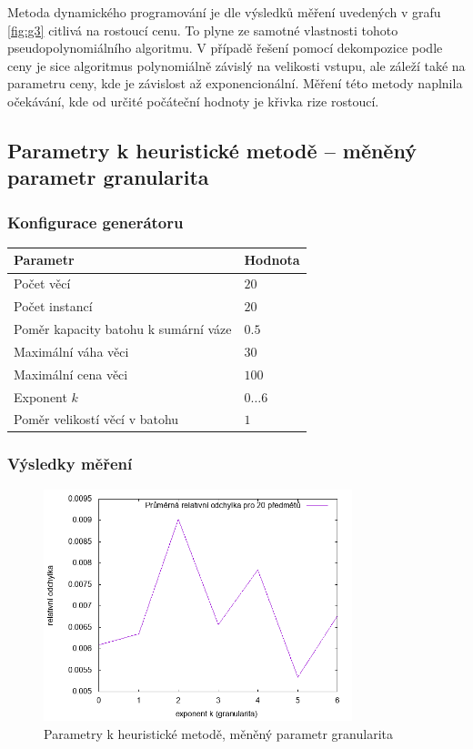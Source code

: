 \documentclass{article}
\begin{document}
Metoda dynamického programování je dle výsledků měření uvedených v grafu \ref{fig:g3} citlivá na rostoucí cenu.
To plyne ze samotné vlastnosti tohoto pseudopolynomiálního algoritmu.
V případě řešení pomocí dekompozice podle ceny je sice algoritmus polynomiálně závislý na velikosti vstupu, ale záleží také na parametru ceny, kde je závislost až exponencionální.
Měření této metody naplnila očekávání, kde od určité počáteční hodnoty je křivka rize rostoucí.

\subsection{Parametry k heuristické metodě -- měněný parametr granularita}

\subsubsection*{Konfigurace generátoru}

\begin{table}[H]
\centering
    \begin{tabular}{ |l|l| } 
        \hline
        Parametr & Hodnota \\
        \hline
        \hline
        Počet věcí & $20$ \\
        Počet instancí & $20$ \\
        Poměr kapacity batohu k sumární váze & $0.5$ \\
        Maximální váha věci & $30$ \\
        Maximální cena věci & $100$ \\
        Exponent $k$ & $0 \dots 6$ \\
        Poměr velikostí věcí v batohu & $1$ \\
        \hline
    \end{tabular}
\end{table}

\subsubsection*{Výsledky měření}

\begin{figure}[H]
    \centering
    \includegraphics[width=0.8\textwidth]{inputs-heuristic-granularity/inputs-heuristic-granularity.png}
    \caption{Parametry k heuristické metodě, měněný parametr granularita}
    \label{fig:g5}
\end{figure}
\end{document}
